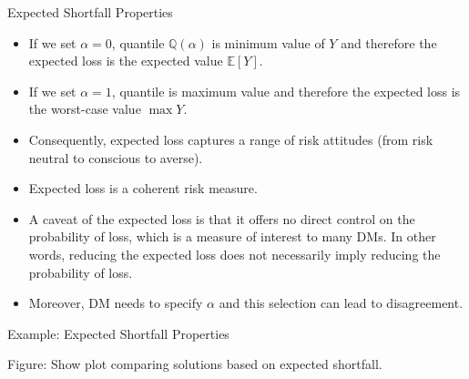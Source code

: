 \documentclass[9pt]{beamer}
\begin{document}
%
\begin{frame}{Expected Shortfall Properties}

\begin{itemize}

\item If we set $\alpha=0$, quantile $\mathbb{Q}(\alpha)$ is minimum value of $Y$ and therefore the expected loss is the expected value $\mathbb{E}[Y]$. 

\item If we set $\alpha=1$, quantile is maximum value and therefore the expected loss is the worst-case value $\max Y$.

\item Consequently, expected loss captures a range of risk attitudes (from risk neutral to conscious to averse).

\item Expected loss is a coherent risk measure. 

\item A caveat of the expected loss is that it offers no direct control on the probability of loss, which is a measure of interest to many DMs. In other words, reducing the expected loss does not necessarily imply reducing the probability of loss. 

\item Moreover, DM needs to specify $\alpha$ and this selection can lead to disagreement. 

\end{itemize}



\end{frame}

%
\begin{frame}{Example: Expected Shortfall Properties}

\begin{block}{}
Figure: Show plot comparing solutions based on expected shortfall. 
\end{block}

\end{frame}
\end{document}
